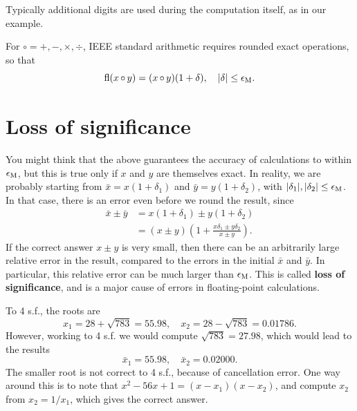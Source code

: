 \documentclass[
  letterpaper,
  DIV=11,
  numbers=noendperiod]{scrreprt}
\begin{document}
\begin{tcolorbox}[enhanced jigsaw, opacityback=0, breakable, title=\textcolor{quarto-callout-note-color}{\faInfo}\hspace{0.5em}{Note}, arc=.35mm, coltitle=black, opacitybacktitle=0.6, bottomrule=.15mm, leftrule=.75mm, left=2mm, colbacktitle=quarto-callout-note-color!10!white, titlerule=0mm, toptitle=1mm, bottomtitle=1mm, colframe=quarto-callout-note-color-frame, rightrule=.15mm, colback=white, toprule=.15mm]

Typically additional digits are used during the computation itself, as
in our example.

\end{tcolorbox}

For \({\circ} = +,-,\times, \div\), IEEE standard arithmetic requires
rounded exact operations, so that \[
\mathrm{fl}(x {\,\circ\,} y) = (x {\,\circ\,} y)(1+\delta), \quad |\delta|\leq\epsilon_{\rm M}.
\]

\section{Loss of significance}\label{loss-of-significance}

You might think that the above guarantees the accuracy of calculations
to within \(\epsilon_{\rm M}\), but this is true only if \(x\) and \(y\)
are themselves exact. In reality, we are probably starting from
\(\bar{x}=x(1+\delta_1)\) and \(\bar{y}=y(1 + \delta_2)\), with
\(|\delta_1|, |\delta_2| \leq \epsilon_{\rm M}\). In that case, there is
an error even before we round the result, since \[
\begin{aligned}
\bar{x} \pm \bar{y} &= x(1+ \delta_1) \pm y(1 + \delta_2)\\
&= (x\pm y)\left(1 + \frac{x\delta_1 \pm y\delta_2}{x\pm y}\right).
\end{aligned}
\] If the correct answer \(x\pm y\) is very small, then there can be an
arbitrarily large relative error in the result, compared to the errors
in the initial \(\bar{x}\) and \(\bar{y}\). In particular, this relative
error can be much larger than \(\epsilon_{\rm M}\). This is called
\textbf{loss of significance}, and is a major cause of errors in
floating-point calculations.

To 4 s.f., the roots are \[
x_1 = 28 + \sqrt{783} = 55.98, \quad x_2 = 28-\sqrt{783} = 0.01786.
\] However, working to 4 s.f. we would compute \(\sqrt{783} = 27.98\),
which would lead to the results \[
\bar{x}_1 = 55.98, \quad \bar{x}_2 = 0.02000.
\] The smaller root is not correct to 4 s.f., because of cancellation
error. One way around this is to note that
\(x^2 - 56x + 1 = (x-x_1)(x-x_2)\), and compute \(x_2\) from
\(x_2 = 1/x_1\), which gives the correct answer.
\end{document}
